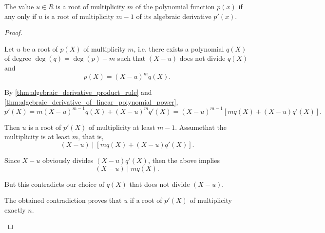 \begin{corollary}\label{thm:repeated_root_iff_derivatives_divisible}
  The value \( u \in R \) is a root of multiplicity \( m \) of the polynomial function \( p(x) \) if any only if \( u \) is a root of multiplicity \( m - 1 \) of its algebraic derivative \( p'(x) \).
\end{corollary}
\begin{proof}
  \begin{description}
    \Implies Let \( u \) be a root of \( p(X) \) of multiplicity \( m \), i.e. there exists a polynomial \( q(X) \) of degree \( \deg(q) = \deg(p) - m \) such that \( (X - u) \) does not divide \( q(X) \) and
    \begin{equation*}
      p(X) = (X - u)^m q(X).
    \end{equation*}

    By \cref{thm:algebraic_derivative_product_rule} and \cref{thm:algebraic_derivative_of_linear_polynomial_power},
    \begin{equation*}
      p'(X)
      =
      m (X - u)^{m-1} q(X) + (X - u)^m q'(X)
      =
      (X - u)^{m-1} [m q(X) + (X - u) q'(X)].
    \end{equation*}

    Then \( u \) is a root of \( p'(X) \) of multiplicity at least \( m - 1 \). Assume\LEM that the multiplicity is at least \( m \), that is,
    \begin{equation*}
      (X - u) \mid [mq(X) + (X - u) q'(X)].
    \end{equation*}

    Since \( X - u \) obviously divides \( (X - u) q'(X) \), then the above implies
    \begin{equation*}
      (X - u) \mid mq(X).
    \end{equation*}

    But this contradicts our choice of \( q(X) \) that does not divide \( (X - u) \).

    The obtained contradiction proves that \( u \) if a root of \( p'(X) \) of multiplicity exactly \( n \).
  \end{description}
\end{proof}

